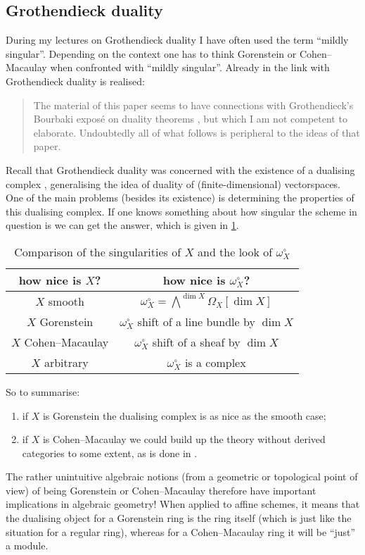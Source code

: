 \documentclass[10pt,a4paper]{article}
\begin{document}
\subsection{Grothendieck duality}
During my lectures on Grothendieck duality I have often used the term ``mildly singular''. Depending on the context one has to think Gorenstein or Cohen--Macaulay when confronted with ``mildly singular''. Already in \cite{bass-ubiquity-gorenstein-rings} the link with Grothendieck duality is realised:
\begin{quote}
  The material of this paper seems to have connections with Grothendieck's Bourbaki expos\'e on duality theorems \cite{grothendieck-theoremes-de-dualite}, but which I am not competent to elaborate. Undoubtedly all of what follows is peripheral to the ideas of that paper.
\end{quote}
Recall that Grothendieck duality was concerned with the existence of a dualising complex \cite{hartshorne-residues-and-duality}, generalising the idea of duality of (finite-dimensional) vectorspaces. One of the main problems (besides its existence) is determining the properties of this dualising complex. If one knows something about how singular the scheme in question is we can get the answer, which is given in \cref{table:comparison-X-dualising-sheaf}.
\begin{table}[ht]
  \centering
  \begin{tabular}{cc}
    \toprule
    how nice is $X$? & how nice is $\omega_X^\circ$? \\\midrule
    $X$ smooth & $\omega_X^\circ=\bigwedge^{\dim X}\Omega_X[\dim X]$ \\
    $X$ Gorenstein & $\omega_X^\circ$ shift of a line bundle by $\dim X$ \\
    $X$ Cohen--Macaulay & $\omega_X^\circ$ shift of a sheaf by $\dim X$ \\
    $X$ arbitrary & $\omega_X^\circ$ is a complex \\
    \bottomrule
  \end{tabular}
  \caption{Comparison of the singularities of $X$ and the look of $\omega_X^\circ$}
  \label{table:comparison-X-dualising-sheaf}
\end{table}
So to summarise:
\begin{enumerate}
  \item if $X$ is Gorenstein the dualising complex is as nice as the smooth case;
  \item if $X$ is Cohen--Macaulay we could build up the theory without derived categories to some extent, as is done in \cite{hartshorne-algebraic-geometry}.
\end{enumerate}
The rather unintuitive algebraic notions (from a geometric or topological point of view) of being Gorenstein or Cohen--Macaulay therefore have important implications in algebraic geometry! When applied to affine schemes, it means that the dualising object for a Gorenstein ring is the ring itself (which is just like the situation for a regular ring), whereas for a Cohen--Macaulay ring it will be ``just'' a module.

\printbibliography
\end{document}
